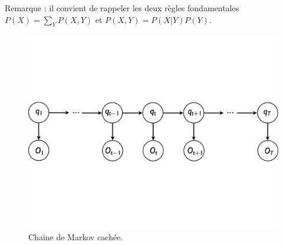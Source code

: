 \documentclass[11pt,addpoints]{exam}
\begin{document}
\begin{questions}
Remarque : il convient de rappeler les deux règles fondamentales $P(X)
= \sum_Y P(X,Y)$ et $P(X,Y) = P(X|Y) P(Y)$. 

\begin{figure}[!ht]
\centering
\includegraphics[width=12cm]{HMM_brut.pdf}
\caption{Chaine de Markov cachée.}
\label{fig:hmm}
\end{figure}



\begin{parts}

\end{parts}
\end{questions}
\end{document}
